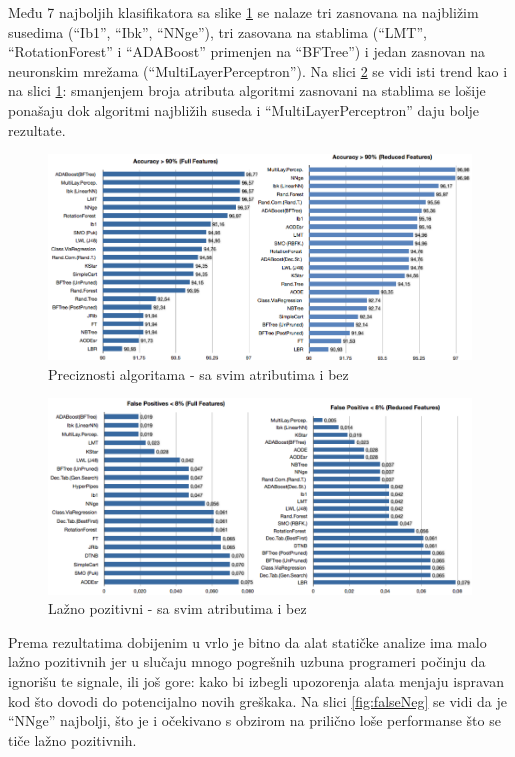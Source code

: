 \documentclass[a4paper]{article}
\theoremstyle{definition}
\begin{document}
{Među 7 najboljih klasifikatora sa slike \ref{fig:acc} se nalaze tri zasnovana na najbližim susedima (``Ib1'', ``Ibk'', ``NNge''), tri zasovana na stablima
(``LMT'', ``RotationForest'' i ``ADABoost'' primenjen na ``BFTree'') i jedan zasnovan na neuronskim mrežama (``MultiLayerPerceptron'').
Na slici  \ref{fig:falsePos} se vidi isti trend kao i na slici  \ref{fig:acc}: smanjenjem broja atributa algoritmi zasnovani na stablima se lošije ponašaju dok algoritmi najbližih suseda i ``MultiLayerPerceptron'' daju bolje rezultate.

\begin{figure}[h!]
\centering
\includegraphics[width=\textwidth]{accuracy.png}
\caption{Preciznosti algoritama - sa svim atributima i bez}
\label{fig:acc}
\end{figure}

\begin{figure}[h!]
\centering
\includegraphics[width=\textwidth]{false_positive.png}
\caption{Lažno pozitivni - sa svim atributima i bez}
\label{fig:falsePos}
\end{figure}

Prema rezultatima dobijenim u  \cite{baca} vrlo je bitno da alat statičke analize ima malo lažno pozitivnih jer
u slučaju mnogo pogrešnih uzbuna programeri počinju da ignorišu te signale, ili još gore: kako bi izbegli upozorenja alata menjaju ispravan kod što dovodi do potencijalno
 novih greškaka. Na slici \ref{fig:falseNeg} se vidi da je ``NNge'' najbolji, što je i očekivano s obzirom na prilično
loše performanse što se tiče lažno pozitivnih.

}
\end{document}
